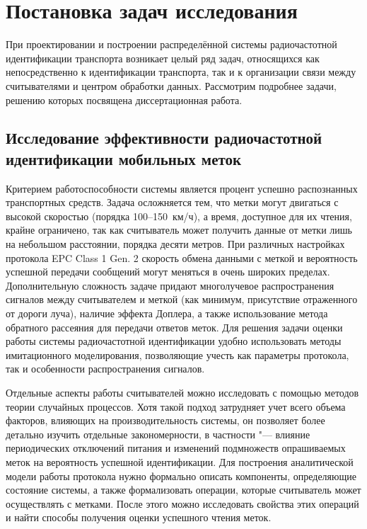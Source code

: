 \section{Постановка задач исследования}\label{sec:ch1_problems}

При проектировании и построении распределённой системы радиочастотной идентификации транспорта возникает целый ряд задач, относящихся как непосредственно к идентификации транспорта, так и к организации связи между считывателями и центром обработки данных. Рассмотрим подробнее задачи, решению которых посвящена диссертационная работа.

\subsection{Исследование эффективности радиочастотной идентификации мобильных меток}

Критерием работоспособности системы является процент успешно распознанных транспортных средств. Задача осложняется тем, что метки могут двигаться с высокой скоростью (порядка 100--150~км/ч), а время, доступное для их чтения, крайне ограничено, так как считыватель может получить данные от метки лишь на небольшом расстоянии, порядка десяти метров. При различных настройках протокола EPC Class 1 Gen. 2 скорость обмена данными с меткой и вероятность успешной передачи сообщений могут меняться в очень широких пределах. Дополнительную сложность задаче придают многолучевое распространения сигналов между считывателем и меткой (как минимум, присутствие отраженного от дороги луча), наличие эффекта Доплера, а также использование метода обратного рассеяния для передачи ответов меток. Для решения задачи оценки работы системы радиочастотной идентификации удобно использовать методы имитационного моделирования, позволяющие учесть как параметры протокола, так и особенности распространения сигналов.

Отдельные аспекты работы считывателей можно исследовать с помощью методов теории случайных процессов. Хотя такой подход затрудняет учет всего объема факторов, влияющих на производительность системы, он позволяет более детально изучить отдельные закономерности, в частности "--- влияние периодических отключений питания и изменений подмножеств опрашиваемых меток на вероятность успешной идентификации. Для построения аналитической модели работы протокола нужно формально описать компоненты, определяющие состояние системы, а также формализовать операции, которые считыватель может осуществлять с метками. После этого можно исследовать свойства этих операций и найти способы получения оценки успешного чтения меток.

